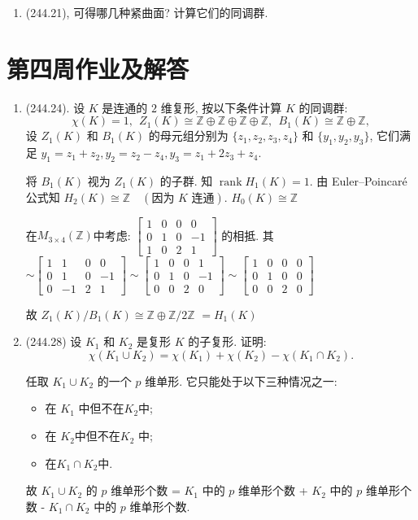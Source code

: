 \begin{enumerate}
\item(244.21), 可得哪几种紧曲面? 计算它们的同调群.

\end{enumerate}

\section{第四周作业及解答}
\begin{enumerate}
    \item (244.24). 设 $K$ 是连通的 $2$ 维复形, 按以下条件计算 $K$ 的同调群:
$$
\chi(K) = 1,\ \ Z_1(K) \cong \mathbb{Z} \oplus \mathbb{Z} \oplus \mathbb{Z} \oplus \mathbb{Z},\ \ B_1(K) \cong \mathbb{Z} \oplus \mathbb{Z},
$$
设 $Z_1(K)$ 和 $B_1(K)$ 的母元组分别为 $\{z_1, z_2, z_3, z_4\}$ 和 $\{y_1, y_2, y_3\}$, 它们满足 $y_1 = z_1 + z_2, y_2 = z_2 - z_4, y_3 = z_1 + 2z_3 + z_4$.
    \begin{proofc}[解答]
        将 $B_1(K)$ 视为 $Z_1(K)$ 的子群. 知 $\operatorname{rank} H_1(K) = 1$. 由 Euler--Poincaré 公式知 $H_2(K)\cong \mathbb{Z} \quad (\text{因为 } K \text{ 连通})$.
$H_0(K) \cong \mathbb{Z}$

在$M_{3 \times 4}(\mathbb{Z})$中考虑: $\begin{bmatrix} 1 & 0 & 0 & 0\\ 0& 1 & 0 & -1 \\ 1 & 0 & 2 & 1 \end{bmatrix}$ 的相抵. 其 $\sim\begin{bmatrix} 1 & 1 & 0 & 0 \\ 0 & 1 & 0 & -1 \\ 0 & -1 & 2 & 1 \end{bmatrix}
\sim \begin{bmatrix} 1 & 0 & 0 & 1 \\ 0 & 1 & 0 & -1 \\ 0 & 0 & 2 & 0 \end{bmatrix} \sim \begin{bmatrix} 1 & 0 & 0 & 0 \\ 0 & 1 & 0 & 0 \\ 0 & 0 & 2 & 0 \end{bmatrix}$

故 $Z_1(K) / B_1(K) \cong \mathbb{Z} \oplus \mathbb{Z} / 2\mathbb{Z}$
$= H_1(K)$
    \end{proofc}

    \item(244.28) 设 $K_1$ 和 $K_2$ 是复形 $K$ 的子复形. 证明:
$$
\chi(K_1 \cup K_2) = \chi(K_1) + \chi(K_2) - \chi(K_1 \cap K_2).
$$
    \begin{proofc}
    任取 $K_1 \cup K_2$ 的一个 $p$ 维单形. 它只能处于以下三种情况之一:
    \begin{itemize}
    \item[(1)]在 $K_1$ 中但不在$K_2$中;
    \item[(2)]在 $K_2$中但不在$ K_2$ 中;
    \item[(3)]在$K_1\cap K_2$中.
    \end{itemize}
故 $K_1 \cup K_2$ 的 $p$ 维单形个数 = $K_1$ 中的 $p$ 维单形个数 + $K_2$ 中的 $p$ 维单形个数
 - $K_1 \cap K_2$ 中的 $p$ 维单形个数.


\end{proofc}
\end{enumerate}
